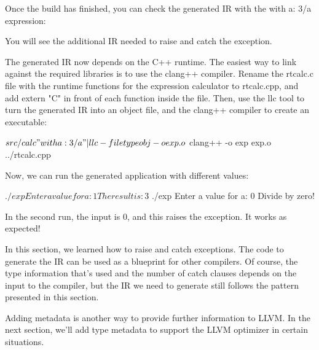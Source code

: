 Once the build has finished, you can check the generated IR with the with a: 3/a expression:


You will see the additional IR needed to raise and catch the exception.

The generated IR now depends on the C++ runtime. The easiest way to link against the required libraries is to use the clang++ compiler. Rename the rtcalc.c file with the runtime functions for the expression calculator to rtcalc.cpp, and add extern "C" in front of each function inside the file. Then, use the llc tool to turn the generated IR into an object file, and the clang++ compiler to create an executable:

\begin{shell}
$ src/calc "with a: 3/a" | llc -filetype obj -o exp.o
$ clang++ -o exp exp.o ../rtcalc.cpp
\end{shell}

Now, we can run the generated application with different values:

\begin{shell}
$ ./exp
Enter a value for a: 1
The result is: 3
$ ./exp
Enter a value for a: 0
Divide by zero!
\end{shell}

In the second run, the input is 0, and this raises the exception. It works as expected!

In this section, we learned how to raise and catch exceptions. The code to generate the IR can be used as a blueprint for other compilers. Of course, the type information that’s used and the number of catch clauses depends on the input to the compiler, but the IR we need to generate still follows the pattern presented in this section.

Adding metadata is another way to provide further information to LLVM. In the next section, we’ll add type metadata to support the LLVM optimizer in certain situations.









































